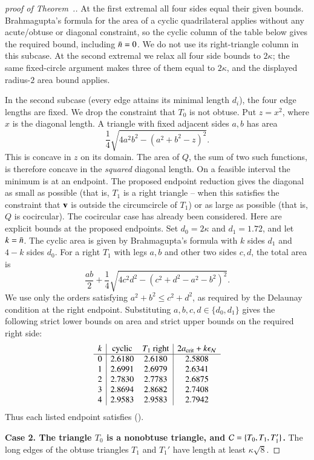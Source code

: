 \begin{proof}[proof of Theorem~.]
At the first extremal all four sides equal their given bounds.
Brahmagupta's formula for the area of a cyclic quadrilateral applies
without any acute/obtuse or diagonal constraint, so the cyclic column
of the table below gives the required bound, including $\bar n=0$. We do
not use its right-triangle column in this subcase. At the second
extremal we relax all four side bounds to $2\kappa$; the same
fixed-circle argument makes three of them equal to $2\kappa$, and the
displayed radius-$2$ area bound applies.

In the second subcase (every edge attains its minimal length $d_i$),
the four edge lengths are fixed.  We drop the constraint that $T_0$ is
not obtuse. Put $z=x^2$, where $x$ is the diagonal length.  A triangle with
fixed adjacent sides $a,b$ has area
\[
\frac14\sqrt{4a^2b^2-(a^2+b^2-z)^2}.
\]
This is concave in $z$ on its domain.  The area of $Q$, the sum of two
such functions, is therefore concave in the \emph{squared}
diagonal length.  On a feasible interval the minimum is at an
endpoint.  The proposed endpoint reduction gives the diagonal as
small as possible (that is, $T_1$ is a right triangle -- when this
satisfies the constraint that ${\mathbf v}$ is outside the circumcircle of
$T_1$) or as large as possible (that is, $Q$ is cocircular).  The
cocircular case has already been considered.
Here are explicit bounds at the proposed endpoints.  Set $d_0=2\kappa$
and $d_1=1.72$, and let $k=\bar n$.  The cyclic area is given by
Brahmagupta's formula with $k$ sides $d_1$ and $4-k$ sides $d_0$.
For a right $T_1$ with legs $a,b$ and other two sides $c,d$,
the total area is
\[
\frac{ab}{2}+\frac14
\sqrt{4c^2d^2-(c^2+d^2-a^2-b^2)^2}.
\]
We use only the orders satisfying $a^2+b^2\le c^2+d^2$, as
required by the Delaunay condition at the right endpoint.  Substituting
$a,b,c,d\in\{d_0,d_1\}$ gives the following strict lower bounds on
area and strict upper bounds on the required right side:
\[
\begin{array}{c|cc|c}
k&\text{cyclic}&T_1\text{ right}&2a_\text{crit}+k\epsilon_{\mathcal N}\\ \hline
0&2.6180&2.6180&2.5808\\
1&2.6991&2.6979&2.6341\\
2&2.7830&2.7783&2.6875\\
3&2.8694&2.8682&2.7408\\
4&2.9583&2.9583&2.7942
\end{array}
\]
Thus each listed endpoint satisfies ().

{\bf Case 2. The triangle $T_0$ is a nonobtuse triangle, and
  $\mathcal C=\{T_0,T_1,T_1'\}$.}  
The long edges of the obtuse triangles
$T_1$ and $T_1'$ have length at least $\kappa\sqrt{8}$.


\end{proof}
